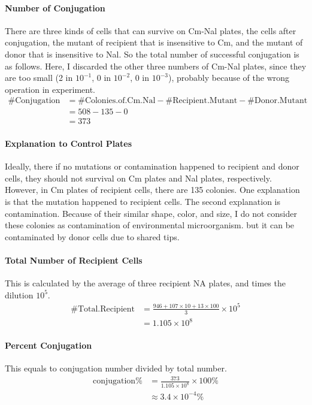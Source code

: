 \documentclass{article}
\begin{document}
			\paragraph{Number of Conjugation} There are three kinds of cells that can survive on Cm-Nal plates, the cells after conjugation, the mutant of recipient that is insensitive to Cm, and the mutant of donor that is insensitive to Nal. So the total number of successful conjugation is as follows. Here, I discarded the other three numbers of Cm-Nal plates, since they are too small (2 in $10 ^ {-1}$, 0 in $10^{-2}$, 0 in $10 ^ {-3}$), probably because of the wrong operation in experiment.
			$$
			\begin{aligned}
			\#\text{Conjugation} &= \#\text{Colonies.of.Cm.Nal} - \#\text{Recipient.Mutant} - \#\text{Donor.Mutant}\\
			&= 508 - 135 - 0\\
			&= 373
			\end{aligned}
			$$

			\paragraph{Explanation to Control Plates} Ideally, there if no mutations or contamination happened to recipient and donor cells, they should not survival on Cm plates and Nal plates, respectively. However, in Cm plates of recipient cells, there are 135 colonies. One explanation is that the mutation happened to recipient cells. The second explanation is contamination. Because of their similar shape, color, and size, I do not consider these colonies as contamination of environmental microorganism. but it can be contaminated by donor cells due to shared tips.

			\paragraph{Total Number of Recipient Cells} This is calculated by the average of three recipient NA plates, and times the dilution $10 ^ {5}$.
			$$
			\begin{aligned}
			\#\text{Total.Recipient} &= \frac{946 + 107 \times 10 + 13 \times 100}{3} \times 10 ^{5}\\
			&= 1.105 \times 10 ^ 8
			\end{aligned}
			$$ 
			
			\paragraph{Percent Conjugation} This equals to conjugation number divided by total number.
			$$
			\begin{aligned}
			\text{conjugation}\% &= \frac{373}{1.105 \times 10 ^ 8}\times 100 \%\\
			&\approx 3.4 \times 10 ^ {-4}\%
			\end{aligned}
			$$
\end{document}
